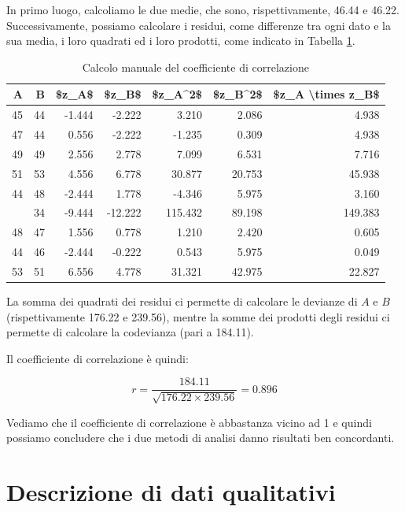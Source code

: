 \documentclass[a4paper,12pt,oneside]{book}
\begin{document}
In primo luogo, calcoliamo le due medie, che sono, rispettivamente, 46.44 e 46.22. Successivamente, possiamo calcolare i residui, come differenze tra ogni dato e la sua media, i loro quadrati ed i loro prodotti, come indicato in Tabella \ref{tab:tabName3}.

\begin{table}

\caption{\label{tab:tabName3}Calcolo manuale del coefficiente di correlazione}
\centering
\begin{tabular}[t]{rrrrrrr}
\toprule
A & B & \$z\_A\$ & \$z\_B\$ & \$z\_A\textasciicircum{}2\$ & \$z\_B\textasciicircum{}2\$ & \$z\_A \textbackslash{}times z\_B\$\\
\midrule
45 & 44 & -1.444 & -2.222 & 3.210 & 2.086 & 4.938\\
47 & 44 & 0.556 & -2.222 & -1.235 & 0.309 & 4.938\\
49 & 49 & 2.556 & 2.778 & 7.099 & 6.531 & 7.716\\
51 & 53 & 4.556 & 6.778 & 30.877 & 20.753 & 45.938\\
44 & 48 & -2.444 & 1.778 & -4.346 & 5.975 & 3.160\\
\addlinespace
37 & 34 & -9.444 & -12.222 & 115.432 & 89.198 & 149.383\\
48 & 47 & 1.556 & 0.778 & 1.210 & 2.420 & 0.605\\
44 & 46 & -2.444 & -0.222 & 0.543 & 5.975 & 0.049\\
53 & 51 & 6.556 & 4.778 & 31.321 & 42.975 & 22.827\\
\bottomrule
\end{tabular}
\end{table}

La somma dei quadrati dei residui ci permette di calcolare le devianze di \(A\) e \(B\) (rispettivamente 176.22 e 239.56), mentre la somme dei prodotti degli residui ci permette di calcolare la codevianza (pari a 184.11).

Il coefficiente di correlazione è quindi:

\[r = \frac{184.11}{\sqrt{176.22 \times 239.56}} = 0.896\]

Vediamo che il coefficiente di correlazione è abbastanza vicino ad 1 e quindi possiamo concludere che i due metodi di analisi danno risultati ben concordanti.

\hypertarget{descrizione-di-dati-qualitativi}{%
\section{Descrizione di dati qualitativi}\label{descrizione-di-dati-qualitativi}}
\end{document}
